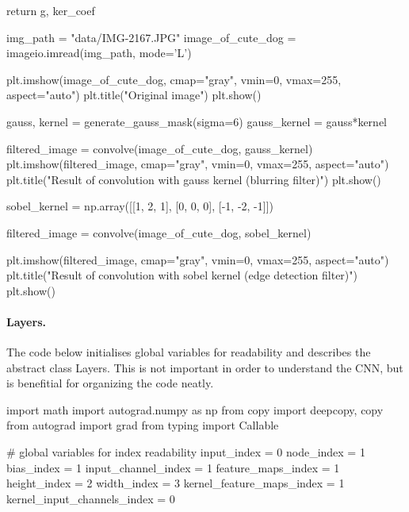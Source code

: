\documentclass[%
oneside,                 %
final,                   %
10pt]{article}
\begin{document}
    return g, ker_coef


img_path = "data/IMG-2167.JPG"
image_of_cute_dog = imageio.imread(img_path, mode='L')

plt.imshow(image_of_cute_dog, cmap="gray", vmin=0, vmax=255, aspect="auto")
plt.title("Original image")
plt.show()

gauss, kernel = generate_gauss_mask(sigma=6)
gauss_kernel = gauss*kernel

filtered_image = convolve(image_of_cute_dog, gauss_kernel)
plt.imshow(filtered_image, cmap="gray", vmin=0, vmax=255, aspect="auto")
plt.title("Result of convolution with gauss kernel (blurring filter)")
plt.show()

sobel_kernel = np.array([[1, 2, 1],
                    [0, 0, 0], 
                    [-1, -2, -1]])

filtered_image = convolve(image_of_cute_dog, sobel_kernel)

plt.imshow(filtered_image, cmap="gray", vmin=0, vmax=255, aspect="auto")
plt.title("Result of convolution with sobel kernel (edge detection filter)")
plt.show()

\epycod


\paragraph{Layers.}
The code below initialises global variables for readability and
describes the abstract class Layers. This is not important in order to
understand the CNN, but is benefitial for organizing the code neatly.
































\bpycod
import math
import autograd.numpy as np
from copy import deepcopy, copy
from autograd import grad
from typing import Callable

# global variables for index readability
input_index = 0
node_index = 1
bias_index = 1
input_channel_index = 1
feature_maps_index = 1
height_index = 2
width_index = 3
kernel_feature_maps_index = 1
kernel_input_channels_index = 0
\end{document}
